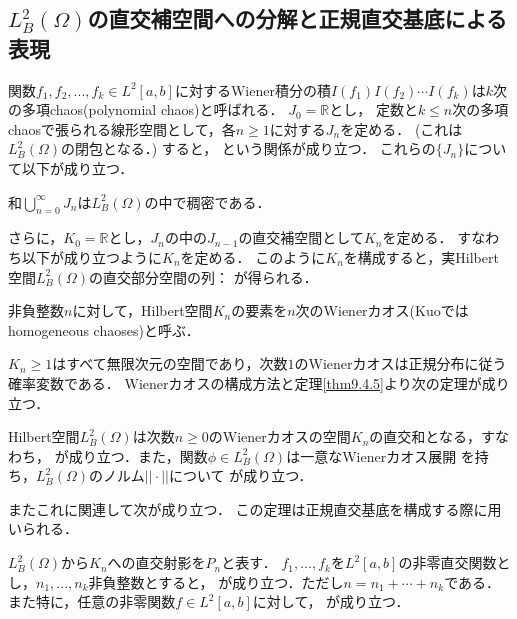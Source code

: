 \subsection{$L^2_B(\Omega)$の直交補空間への分解と正規直交基底による表現}
関数$f_1,f_2,...,f_k\in L^2[a,b]$に対するWiener積分の積$I(f_1)I(f_2)\cdots I(f_k)$は$k$次の多項chaos(polynomial chaos)と呼ばれる．
$J_0=\mathbb{R}$とし，
定数と$k\le n$次の多項chaosで張られる線形空間として，各$n\ge 1$に対する$J_n$を定める．
(これは$L^2_B(\Omega)$の閉包となる．)%
すると，
という関係が成り立つ．
これらの$\{J_n\}$について以下が成り立つ．
\begin{theorem}\label{thm9.4.5}%
和$\bigcup_{n=0}^\infty J_n$は$L^2_B(\Omega)$の中で稠密である．
\end{theorem}

さらに，$K_0=\mathbb{R}$とし，$J_n$の中の$J_{n-1}$の直交補空間として$K_n$を定める．
すなわち以下が成り立つように$K_n$を定める．
このように$K_n$を構成すると，実Hilbert空間$L^2_B(\Omega)$の直交部分空間の列：
が得られる．
\begin{definition}
非負整数$n$に対して，Hilbert空間$K_n$の要素を$n$次のWienerカオス(Kuo\cite{Kuo2006}ではhomogeneous chaoses)と呼ぶ．
\end{definition}
$K_n\ge 1$はすべて無限次元の空間であり，次数$1$のWienerカオスは正規分布に従う確率変数である．
Wienerカオスの構成方法と定理\ref{thm9.4.5}より次の定理が成り立つ．
\begin{theorem}\label{thm9.4.7}%
Hilbert空間$L^2_B(\Omega)$は次数$n\ge0$のWienerカオスの空間$K_n$の直交和となる，すなわち，
が成り立つ．また，関数$\phi\in L^2_B(\Omega)$は一意なWienerカオス展開
を持ち，$L^2_B(\Omega)$のノルム$||\cdot||$について
が成り立つ．
\end{theorem}
またこれに関連して次が成り立つ．
この定理は正規直交基底を構成する際に用いられる．
\begin{theorem}\label{thm9.4.9}%
$L^2_B(\Omega)$から$K_n$への直交射影を$P_n$と表す．
$f_1,...,f_k$を$L^2[a,b]$の非零直交関数とし，$n_1,...,n_k$非負整数とすると，
が成り立つ．ただし$n=n_1+\cdots+n_k$である．
また特に，任意の非零関数$f\in L^2[a,b]$に対して，
が成り立つ．
\end{theorem}

